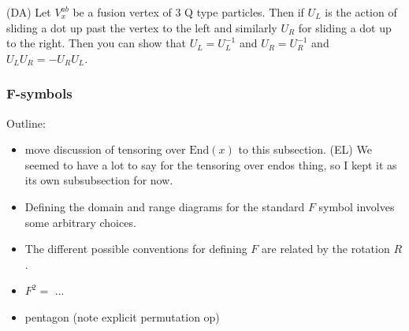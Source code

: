 \documentclass[12pt,a4paper]{article}
\newcommand{\End}{\text{End}}
\newcommand{\dave}[1]{{\color{ao(english)}\footnotesize{(DA) #1}}}
\newcommand{\ethan}[1]{{\color{amethyst}\footnotesize{(EL) #1}}}
\begin{document}
\dave{Let $V^{ab}_x$ be a fusion vertex of $3$ Q type particles. Then if $U_L$ is the action of sliding a dot up past the vertex to the left and similarly $U_R$ for sliding a dot up to the right. Then you can show that $U_L = U_L^{-1}$ and $U_R = U_R^{-1}$ and $U_L U_R = - U_R U_L$.}



\subsubsection{F-symbols}

Outline:
\begin{itemize}
\item move discussion of tensoring over $\End(x)$ to this subsection. 
\ethan{We seemed to have a lot to say for the tensoring over endos thing, so I kept it as its own subsubsection for now.}
\item Defining the domain and range diagrams for the standard $F$ symbol involves some arbitrary choices.
\item The different possible conventions for defining $F$ are related by the rotation $R$.
\item $F^2 = $ ...
\item pentagon (note explicit permutation op)
\end{itemize}
\end{document}
